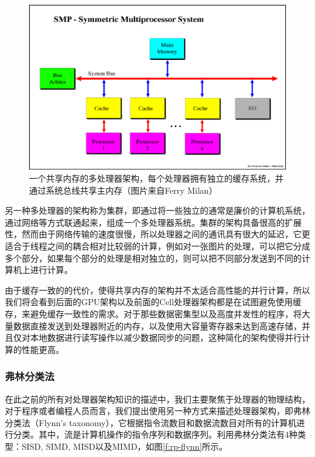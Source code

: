 \begin{figure}
	\includegraphics[width=1.\textwidth]{figures/rp/smp}
	\caption{一个共享内存的多处理器架构，每个处理器拥有独立的缓存系统，并通过系统总线共享主内存（图片来自Ferry Milan）}
	\label{f:rp-smp}
\end{figure}

另一种多处理器的架构称为集群，即通过将一些独立的通常是廉价的计算机系统，通过网络等方式联通起来，组成一个多处理器系统。集群的架构具备很高的扩展性，然而由于网络传输的速度很慢，所以处理器之间的通讯具有很大的延迟，它更适合于线程之间的耦合相对比较弱的计算，例如对一张图片的处理，可以把它分成多个部分，如果每个部分的处理是相对独立的，则可以把不同部分发送到不同的计算机上进行计算。

由于缓存一致的的代价，使得共享内存的架构并不太适合高性能的并行计算，所以我们将会看到后面的GPU架构以及前面的Cell处理器架构都是在试图避免使用缓存，来避免缓存一致性的需求。对于那些数据密集型以及高度并发性的程序，将大量数据直接发送到处理器附近的内存，以及使用大容量寄存器来达到高速存储，并且仅对本地数据进行读写操作以减少数据同步的问题，这种简化的架构使得并行计算的性能更高。




\subsubsection{弗林分类法}	
在此之前的所有对处理器架构知识的描述中，我们主要聚焦于处理器的物理结构，对于程序或者编程人员而言，我们提出使用另一种方式来描述处理器架构，即弗林分类法（Flynn's taxonomy），它根据指令流数目和数据流数目对所有的计算机进行分类。其中，流是计算机操作的指令序列和数据序列。利用弗林分类法有4种类型：SISD, SIMD, MISD以及MIMD，如图\ref{f:rp-flynn}所示。

